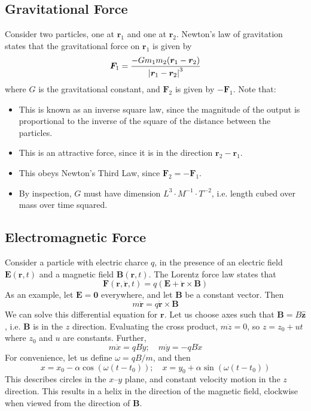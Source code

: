 \documentclass{article}
\begin{document}
\subsection{Gravitational Force}
Consider two particles, one at $\bm r_1$ and one at $\bm r_2$. Newton's law of gravitation states that the gravitational force on $\bm r_1$ is given by
\[ \bm F_1 = \frac{- G m_1 m_2 (\bm r_1 - \bm r_2)}{\abs{\bm r_1 - \bm r_2}^3} \]
where $G$ is the gravitational constant, and $\bm F_2$ is given by $-\bm F_1$. Note that:
\begin{itemize}
    \item This is known as an inverse square law, since the magnitude of the output is proportional to the inverse of the square of the distance between the particles.
    \item This is an attractive force, since it is in the direction $\bm r_2 - \bm r_1$.
    \item This obeys Newton's Third Law, since $\bm F_2 = - \bm F_1$.
    \item By inspection, $G$ must have dimension $L^3 \cdot M^{-1} \cdot T^{-2}$, i.e. length cubed over mass over time squared.
\end{itemize}

\subsection{Electromagnetic Force}
Consider a particle with electric charce $q$, in the presence of an electric field $\bm E(\bm r, t)$ and a magnetic field $\bm B(\bm r, t)$. The Lorentz force law states that
\[ \bm F(\bm r, \dot{\bm r}, t) = q\left( \bm E + \dot{\bm r} \times \bm B \right) \]
As an example, let $\bm E = \bm 0$ everywhere, and let $\bm B$ be a constant vector. Then
\[ m \ddot{\bm r} = q \dot{\bm r} \times \bm B \]
We can solve this differential equation for $\bm r$. Let us choose axes such that $\bm B = B \hat{\bm z}$, i.e. $\bm B$ is in the $z$ direction. Evaluating the cross product, $m \ddot{z} = 0$, so $z = z_0 + ut$ where $z_0$ and $u$ are constants. Further,
\[ m \ddot x = qB\dot y;\quad m \ddot y = -qB\dot x \]
For convenience, let us define $\omega = qB/m$, and then
\[ x = x_0 - \alpha \cos(\omega(t - t_0));\quad x = y_0 + \alpha \sin(\omega(t - t_0)) \]
This describes circles in the $x$--$y$ plane, and constant velocity motion in the $z$ direction. This results in a helix in the direction of the magnetic field, clockwise when viewed from the direction of $\bm B$.
\end{document}

